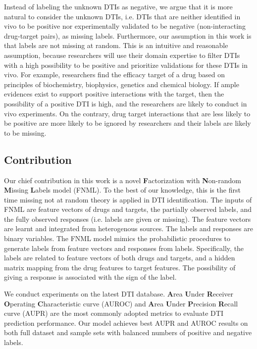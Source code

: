 \documentclass[sigconf,anonymous]{acmart}
\begin{document}
Instead of labeling the unknown DTIs as negative, we argue that it is more natural to consider the unknown DTIs, i.e. DTIs that are neither identified in vivo to be positive nor experimentally validated to be negative (non-interacting drug-target pairs), as missing labels. Furthermore, our assumption in this work is that labels are not missing at random. This is an intuitive and reasonable assumption, because researchers will use their domain expertise to filter DTIs with a high possibility to be positive and prioritize validations for these DTIs in vivo. For example, researchers find the efficacy target of a drug based on principles of biochemistry, biophysics, genetics and chemical biology. If ample evidences exist to support positive interactions with the target, then the possibility of a positive DTI is high, and the researchers are likely to conduct in vivo experiments. On the contrary, drug target interactions that are less likely to be positive are more likely to be ignored by researchers and their labels are likely to be missing.

\subsection{Contribution}
Our chief contribution in this work is a novel \textbf{F}actorization with \textbf{N}on-random \textbf{M}issing \textbf{L}abels model (FNML). To the best of our knowledge, this is the first time missing not at random theory is applied in DTI identification. The inputs of FNML are feature vectors of drugs and targets, the partially observed labels, and the fully observed responses (i.e. labels are given or missing). The feature vectors are learnt and integrated from heterogenous sources. The labels and responses are binary variables. The FNML model mimics the probabilistic procedures to generate labels from feature vectors and responses from labels. Specifically, the labels are related to feature vectors of both drugs and targets, and a hidden matrix mapping from the drug features to target features. The possibility of giving a response is associated with the sign of the label.

We conduct experiments on the latest DTI database. \textbf{A}rea \textbf{U}nder \textbf{R}eceiver \textbf{O}perating \textbf{C}haracteristic curve (AUROC) and \textbf{A}rea \textbf{U}nder \textbf{P}recision \textbf{R}ecall curve (AUPR) are the most commonly adopted metrics to evaluate DTI prediction performance. Our model achieves best AUPR and AUROC results on both full dataset and sample sets with balanced numbers of positive and negative labels. %
\end{document}
